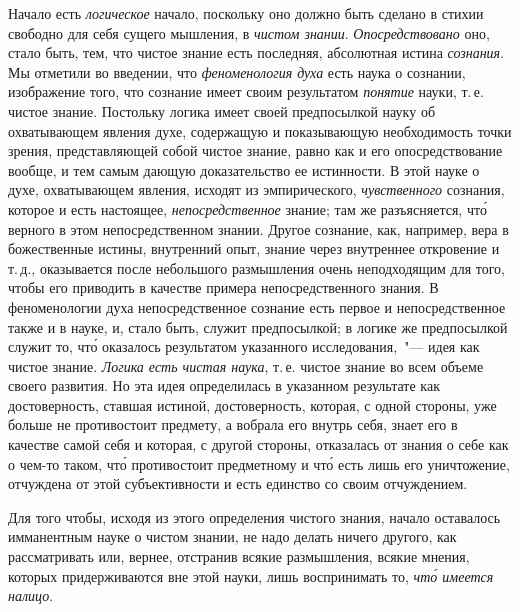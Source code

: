 Начало есть \emph{логическое} начало, поскольку оно должно
быть сделано в стихии свободно для себя сущего мышления,
в \emph{чистом знании}. \emph{Опосредствовано} оно, стало быть,
тем, что чистое знание есть последняя, абсолютная
истина \emph{сознания}. Мы отметили во введении, что \emph{феноменология
духа} есть наука о сознании, изображение
того, что сознание имеет своим результатом \emph{понятие}
науки, т.\,е. чистое знание. Постольку логика имеет своей
предпосылкой науку об охватывающем явления духе,
содержащую и показывающую необходимость точки зрения,
представляющей собой чистое знание, равно как и
его опосредствование вообще, и тем самым дающую доказательство
ее истинности. В этой науке о духе, охватывающем
явления, исходят из эмпирического, \emph{чувственного}
сознания, которое и есть настоящее, \emph{непосредственное}
знание; там же разъясняется, чт\'о верного в этом
непосредственном знании. Другое сознание, как, например,
вера в божественные истины, внутренний опыт, знание
через внутреннее откровение и т.\,д., оказывается
после небольшого размышления очень неподходящим
для того, чтобы его приводить в качестве примера непосредственного
знания. В феноменологии духа непосредственное
сознание есть первое и непосредственное также
и в науке, и, стало быть, служит предпосылкой; в логике
же предпосылкой служит то, чт\'о оказалось результатом
указанного исследования,~"--- идея как чистое знание. \emph{Логика
есть чистая наука}, т.\,е. чистое знание во всем объеме
своего развития. Но эта идея определилась в указанном
результате как достоверность, ставшая истиной, достоверность,
которая, с одной стороны, уже больше не
противостоит предмету, а вобрала его внутрь себя, знает
его в качестве самой себя
и которая, с другой стороны,
отказалась от знания о себе как о чем-то таком, чт\'о противостоит
предметному и чт\'о есть лишь его уничтожение,
отчуждена от этой субъективности и есть единство со
своим отчуждением.

Для того чтобы, исходя из этого определения чистого
знания, начало оставалось имманентным науке о чистом
знании, не надо делать ничего другого, как рассматривать
или, вернее, отстранив всякие размышления, всякие
мнения, которых придерживаются вне этой науки, лишь
воспринимать то, \emph{чт\'о имеется налицо}.


